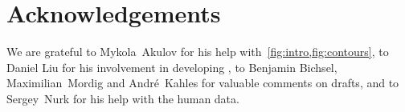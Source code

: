 \section*{Acknowledgements} \label{sec:acknoledgements}

We are grateful to Mykola~Akulov for his help
with~\cref{fig:intro,fig:contours}, to Daniel Liu for his involvement in
developing \pabench, to Benjamin Bichsel, Maximilian~Mordig and André~Kahles for
valuable comments on drafts, and to Sergey~Nurk for his help with the human
data.
